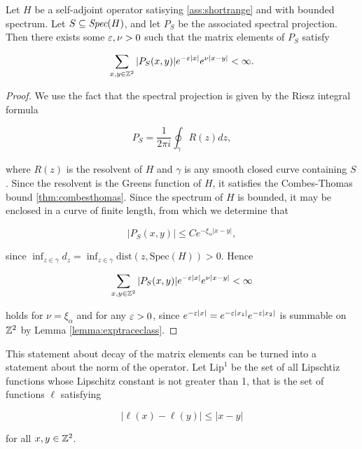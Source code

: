 \documentclass[12pt, letterpaper]{article}
\begin{document}
\begin{lemma}
Let $H$ be a self-adjoint operator satisying \ref{ass:shortrange} and with bounded spectrum. Let $S \subseteq \emph{Spec}(H)$, and let $P_S$ be the associated spectral projection. Then there exists some $\varepsilon,\nu>0$ such that the matrix elements of $P_S$ satisfy

\[\sum_{x,y \in \mathbb{Z}^2} |P_S(x,y)| e^{-\varepsilon |x|} e^{\nu |x-y|} < \infty.\]
\label{lemma:projectionmatrixelementsdecay}
\end{lemma}
\begin{proof}
We use the fact that the spectral projection is given by the Riesz integral formula

\[P_S = \frac{1}{2\pi i} \oint_\gamma R(z)dz,\]

where $R(z)$ is the resolvent of $H$ and $\gamma$ is any smooth closed curve containing $S$. Since the resolvent is the Greens function of $H$, it satisfies the Combes-Thomas bound \ref{thm:combesthomas}. Since the spectrum of $H$ is bounded, it may be enclosed in a curve of finite length, from which we determine that

\[|P_S(x,y)| \leq Ce^{-\xi_\alpha|x-y|},\]

since $\inf_{z \in \gamma} d_z = \inf_{z\in\gamma} \text{dist}(z,\text{Spec}(H)) > 0$. Hence

\[\sum_{x,y \in \mathbb{Z}^2} |P_S(x,y)| e^{-\varepsilon |x|} e^{\nu |x-y|} < \infty\]

holds for $\nu = \xi_\alpha$ and for any $\varepsilon>0$, since $e^{-\varepsilon|x|} = e^{-\varepsilon|x_1|}e^{-\varepsilon|x_2|}$ is summable on $\mathbb{Z}^2$ by Lemma \ref{lemma:exptraceclass}.

\end{proof}

This statement about decay of the matrix elements can be turned into a statement about the norm of the operator. Let $\text{Lip}^1$ be the set of all Lipschtiz functions whose Lipschitz constant is not greater than 1, that is the set of functions $\ell$ satisfying 

\[|\ell(x)-\ell(y)| \leq |x-y|\]

for all $x,y \in \mathbb{Z}^2$.
\end{document}
